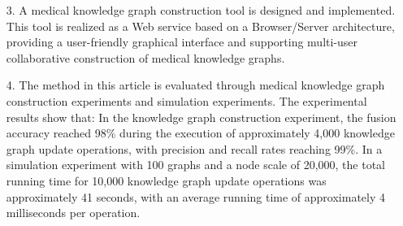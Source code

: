 \begin{eabstract}
\begin{itemize}
    \item[3.] A medical knowledge graph construction tool is designed and implemented. This tool is realized as a Web service based on a Browser/Server architecture, providing a user-friendly graphical interface and supporting multi-user collaborative construction of medical knowledge graphs.
    \item[4.] The method in this article is evaluated through medical knowledge graph construction experiments and simulation experiments. The experimental results show that: In the knowledge graph construction experiment, the fusion accuracy reached 98\% during the execution of approximately 4,000 knowledge graph update operations, with precision and recall rates reaching 99\%. In a simulation experiment with 100 graphs and a node scale of 20,000, the total running time for 10,000 knowledge graph update operations was approximately 41 seconds, with an average running time of approximately 4 milliseconds per operation.
\end{itemize}
\end{eabstract}
    
    